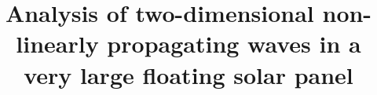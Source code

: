 %
%
%
%
%
%
\RequirePackage{fix-cm}
%
\documentclass{svjour3}                     %
%
\smartqed  %
%
\usepackage{graphicx}
%
%

%
\newcommand*{\bkt}[1]{\left(#1\right)}
\newcommand*{\Bkt}[1]{\left[#1\right]}
\newcommand*{\BKT}[1]{\left\{#1\right\}}

%
%


\title{Analysis of two-dimensional non-linearly propagating waves in a very large floating solar panel%
}


